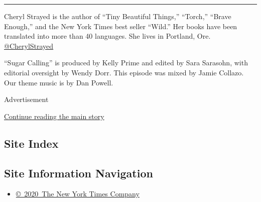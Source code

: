 \begin{center}\rule{0.5\linewidth}{\linethickness}\end{center}

Cheryl Strayed is the author of ``Tiny Beautiful Things,'' ``Torch,''
``Brave Enough,'' and the New York Times best seller ``Wild.'' Her books
have been translated into more than 40 languages. She lives in Portland,
Ore.
\href{https://twitter.com/CherylStrayed?ref_src=twsrc\%5Egoogle\%7Ctwcamp\%5Eserp\%7Ctwgr\%5Eauthor}{@CherylStrayed}

``Sugar Calling'' is produced by Kelly Prime and edited by Sara
Sarasohn, with editorial oversight by Wendy Dorr. This episode was mixed
by Jamie Collazo. Our theme music is by Dan Powell.

Advertisement

\protect\hyperlink{after-bottom}{Continue reading the main story}

\hypertarget{site-index}{%
\subsection{Site Index}\label{site-index}}

\hypertarget{site-information-navigation}{%
\subsection{Site Information
Navigation}\label{site-information-navigation}}

\begin{itemize}
\tightlist
\item
  \href{https://help.nytimes3xbfgragh.onion/hc/en-us/articles/115014792127-Copyright-notice}{©~2020~The
  New York Times Company}
\end{itemize}

